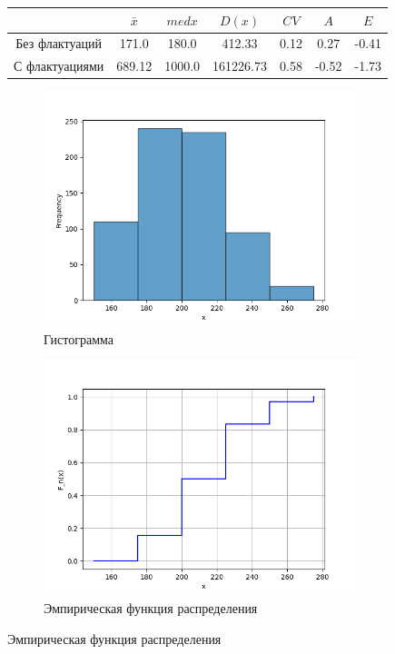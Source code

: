 \documentclass[12pt,a4paper]{article}
\begin{document}
\begin{figure}
		\begin{subtable}[htbp!]{0.8\textwidth}
			\centering
			\begin{tabular}{ |c|c|c|c|c|c|c| }
				\hline
				& \( \bar x \) & \( med x \) & \( D(x) \) & \( CV \) & \( A \) & \( E \) \\
				\hline
				Без флактуаций & 171.0 & 180.0 & 412.33 & 0.12 & 0.27 & -0.41 \\
				\hline
				С флактуациями & 689.12 & 1000.0 & 161226.73 & 0.58 & -0.52 & -1.73 \\
				\hline
			\end{tabular}
		\end{subtable}
	\end{figure}

	\begin{figure}
		\begin{subfigure}[htbp!]{0.8\textwidth}
			\begin{center}
				\includegraphics[width = 0.8\linewidth]{../graphics/10_hist.png}
				\caption{Гистограмма}
			\end{center}
		\end{subfigure}

		\begin{subfigure}[htbp!]{0.8\textwidth}
			\begin{center}
				\includegraphics[width = 0.8\linewidth]{../graphics/10_cdf.png}
				\caption{Эмпирическая функция распределения}
			\end{center}
		\end{subfigure}


\end{figure}
\end{document}
